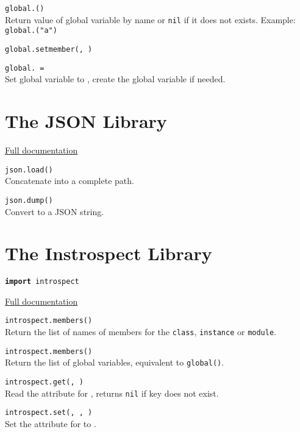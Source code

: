 \hangpar \texttt{global.(}\texttt{)} \\
Return value of global variable  by name or \texttt{nil} if it does not exists. Example: \texttt{global.("a")}

\hangpar \texttt{global.setmember(}\texttt{, }\texttt{)}

\hangpar \texttt{global.}\texttt{ = } \\
Set global variable  to , create the global variable if needed.

\section*{The JSON Library}

\hangpar \href{https://github.com/berry-lang/berry/wiki/Chapter-7\#json-module}{Full documentation}

\hangpar \texttt{json.load(}\texttt{)} \\
Concatenate  into a complete path.

\hangpar \texttt{json.dump(}\texttt{)} \\
Convert  to a JSON string.

\section*{The Instrospect Library}

\hangpar \texttt{\textbf{import} introspect}

\hangpar \href{https://github.com/berry-lang/berry/wiki/Chapter-7\#module-introspect}{Full documentation}

\hangpar \texttt{introspect.members(}\texttt{)} \\
Return the list of names of members for the \texttt{class}, \texttt{instance} or \texttt{module}.

\hangpar \texttt{introspect.members()} \\
Return the list of global variables, equivalent to \texttt{global()}.

\hangpar \texttt{introspect.get(}\texttt{, }\texttt{)} \\
Read the attribute  for , returns \texttt{nil} if key does not exist.

\hangpar \texttt{introspect.set(}\texttt{, }\texttt{, }\texttt{)} \\
Set the attribute  for  to .

